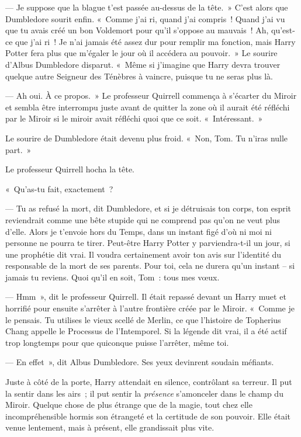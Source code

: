--- Je suppose que la blague t'est passée au-dessus de la tête.~» C'est alors que Dumbledore sourit enfin. «~Comme j'ai ri, quand j'ai compris~! Quand j'ai vu que tu avais créé un bon Voldemort pour qu'il s'oppose au mauvais~! Ah, qu'est-ce que j'ai ri~! Je n'ai jamais été assez dur pour remplir ma fonction, mais Harry Potter fera plus que m'égaler le jour où il accédera au pouvoir.~» Le sourire d'Albus Dumbledore disparut. «~Même si j'imagine que Harry devra trouver quelque autre Seigneur des Ténèbres à vaincre, puisque tu ne seras plus là.

--- Ah oui. À ce propos.~» Le professeur Quirrell commença à s'écarter du Miroir et sembla être interrompu juste avant de quitter la zone où il aurait été réfléchi par le Miroir si le miroir avait réfléchi quoi que ce soit. «~Intéressant.~»

Le sourire de Dumbledore était devenu plus froid. «~Non, Tom. Tu n'iras nulle part.~»

Le professeur Quirrell hocha la tête.

«~Qu'as-tu fait, exactement~?

--- Tu as refusé la mort, dit Dumbledore, et si je détruisais ton corps, ton esprit reviendrait comme une bête stupide qui ne comprend pas qu'on ne veut plus d'elle. Alors je t'envoie hors du Temps, dans un instant figé d'où ni moi ni personne ne pourra te tirer. Peut-être Harry Potter y parviendra-t-il un jour, si une prophétie dit vrai. Il voudra certainement avoir ton avis sur l'identité du responsable de la mort de ses parents. Pour toi, cela ne durera qu'un instant -- si jamais tu reviens. Quoi qu'il en soit, Tom~: tous mes vœux.

--- Hmm~», dit le professeur Quirrell. Il était repassé devant un Harry muet et horrifié pour ensuite s'arrêter à l'autre frontière créée par le Miroir. «~Comme je le pensais. Tu utilises le vieux scellé de Merlin, ce que l'histoire de Topherius Chang appelle le Processus de l'Intemporel. Si la légende dit vrai, il a été actif trop longtemps pour que quiconque puisse l'arrêter, même toi.

--- En effet~», dit Albus Dumbledore. Ses yeux devinrent soudain méfiants.

Juste à côté de la porte, Harry attendait en silence, contrôlant sa terreur. Il put la sentir dans les airs~; il put sentir la \emph{présence} s'amonceler dans le champ du Miroir. Quelque chose de plus étrange que de la magie, tout chez elle incompréhensible hormis son étrangeté et la certitude de son pouvoir. Elle était venue lentement, mais à présent, elle grandissait plus vite.

